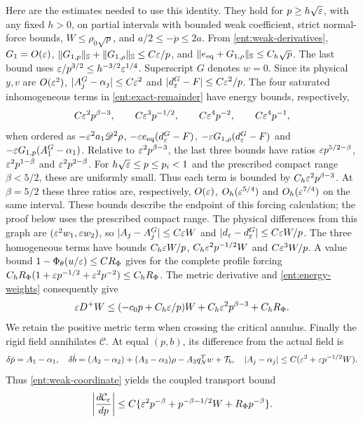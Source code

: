 Here are the estimates needed to use this identity. They hold for
$p\ge h\sqrt{\varepsilon}$, with any fixed $h>0$, on partial intervals with
bounded weak coefficient, strict normal-force bounds,
$W\le\rho_0\sqrt p$, and $a/2\le-\dot p\le2a$.
From \eqref{ent:weak-derivatives},
$G_1=O(\varepsilon)$,
$\|G_{1,p}\|_{\mathbb S}+\|G_{1,\rho}\|_{\mathbb S}\le C\varepsilon/p$,
and $\|e_{\rm eq}+G_{1,\rho}\|_{\mathbb S}\le C_h\sqrt p$.
The last bound uses $\varepsilon/p^{3/2}\le h^{-3/2}\varepsilon^{1/4}$.
Superscript $G$ denotes $w=0$. Since its physical $y,v$ are
$O(\varepsilon^2)$, $|A_j^G-\alpha_j|\le C\varepsilon^2$ and
$|d_\varepsilon^G-F|\le C\varepsilon^2/p$.
The four saturated inhomogeneous terms in
\eqref{ent:exact-remainder} have energy bounds, respectively,
\begin{equation}
 C\varepsilon^2p^{\beta-3},\qquad C\varepsilon^3p^{-1/2},\qquad
 C\varepsilon^4p^{-2},\qquad C\varepsilon^4p^{-1},
 \label{ent:forcing-domination}
\end{equation}
when ordered as $-\varepsilon^2a_1\mathscr D^2\rho$,
$-\varepsilon e_{\rm eq}(d_\varepsilon^G-F)$,
$-\varepsilon G_{1,\rho}(d_\varepsilon^G-F)$ and
$-\varepsilon G_{1,p}(A_1^G-\alpha_1)$.
Relative to $\varepsilon^2p^{\beta-3}$, the last three bounds have ratios
$\varepsilon p^{5/2-\beta}$, $\varepsilon^2p^{1-\beta}$ and
$\varepsilon^2p^{2-\beta}$. For $h\sqrt{\varepsilon}\le p\le p_i<1$ and the
prescribed compact range $\beta<5/2$, these are uniformly small.
Thus each term is bounded by $C_h\varepsilon^2p^{\beta-3}$.
At $\beta=5/2$ these three ratios are, respectively,
$O(\varepsilon)$, $O_h(\varepsilon^{5/4})$ and $O_h(\varepsilon^{7/4})$ on the same
interval. These bounds describe the endpoint of this forcing
calculation; the proof below uses the prescribed compact range.
The physical differences from this graph are
$(\varepsilon^2w_1,\varepsilon w_2)$, so
$|A_j-A_j^G|\le C\varepsilon W$ and
$|d_\varepsilon-d_\varepsilon^G|\le C\varepsilon W/p$.
The three homogeneous terms have bounds
$C_h\varepsilon W/p$, $C_h\varepsilon^2p^{-1/2}W$ and
$C\varepsilon^3W/p$. A value bound $1-\Phi_\theta(u/\varepsilon)\le CR_\Phi$
gives for the complete profile forcing
$C_hR_\Phi(1+\varepsilon p^{-1/2}+\varepsilon^2p^{-2})\le C_hR_\Phi$.
The metric derivative and \eqref{ent:energy-weights} consequently give
\begin{equation}
 \varepsilon D^+W\le(-c_0p+C_h\varepsilon/p)W
                +C_h\varepsilon^2p^{\beta-3}+C_hR_\Phi.
 \label{ent:signed-energy}
\end{equation}
We retain the positive metric term when crossing the critical annulus.
Finally the rigid field annihilates $\mathcal C$. At equal $(p,b)$,
its difference from the actual field is
\[
 \delta\dot p=A_1-\alpha_1,\quad
 \delta\dot b=(A_2-\alpha_2)+(A_3-\alpha_3)\rho
                         -A_3q_N^Tw+\mathcal T_b,
 \quad |A_j-\alpha_j|\le C(\varepsilon^2+\varepsilon p^{-1/2}W).
\]
Thus \eqref{ent:weak-coordinate} yields the coupled transport bound
\begin{equation}
 \left|\frac{d\mathcal C_\varepsilon}{dp}\right|
 \le C\{\varepsilon^2p^{-\beta}+p^{-\beta-1/2}W+R_\Phi p^{-\beta}\}.
 \label{ent:weak-transport}
\end{equation}

